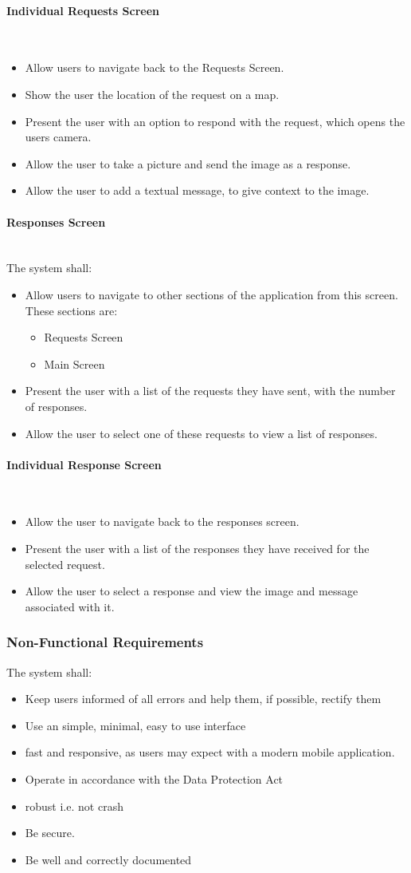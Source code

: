 \documentclass[a4paper]{article}
\newcommand{\subsubsubsection}[1]{\paragraph{#1}\mbox{}\\}
\begin{document}
\subsubsubsection{Individual Requests Screen}
\begin{itemize}
\item Allow users to navigate back to the Requests Screen.
\item Show the user the location of the request on a map.
\item Present the user with an option to respond with the request, which opens the users camera.
\item Allow the user to take a picture and send the image as a response.
\item Allow the user to add a textual message, to give context to the image.
\end{itemize}

\subsubsubsection{Responses Screen}
The system shall:
\begin{itemize}

\item Allow users to navigate to other sections of the application from this screen. These sections are:
\begin{itemize}
\item Requests Screen
\item Main Screen
\end{itemize}
\item Present the user with a list of the requests they have sent, with the number of responses.
\item Allow the user to select one of these requests to view a list of responses.
\end{itemize}
\subsubsubsection{Individual Response Screen}
\begin{itemize}
\item Allow the user to navigate back to the responses screen.
\item Present the user with a list of the responses they have received for the selected request.
\item Allow the user to select a response and view the image and message associated with it.






\end{itemize}
\subsubsection{Non-Functional Requirements}
The system shall:
\begin{itemize}
\item Keep users informed of all errors and help them, if possible, rectify them
\item Use an simple, minimal, easy to use interface
\item fast and responsive, as users may expect with a modern mobile application.
\item Operate in accordance with the Data Protection Act
\item robust i.e. not crash
\item Be secure.
\item Be well and correctly documented
\end{itemize}
\end{document}
